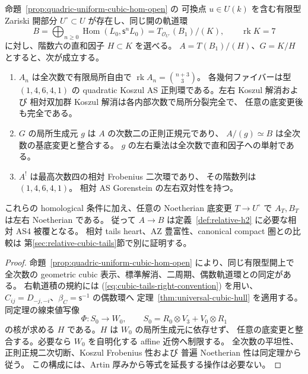 \begin{proposition}[可換点の有限型近傍での相対 AS4 被覆]
\label{prop:quadric-zariski-homological-as-cover}
命題~\ref{prop:quadric-uniform-cubic-hom-open} の
可換点 $u\in U(k)$ を含む有限型 Zariski 開部分
$U^\circ\subset U$ が存在し、同じ開の軌道環
\[
 B=\bigoplus_{n\ge0}\operatorname{Hom}
       (L_0,\mathsf s^nL_0)
       =T_{\mathcal O_{U^\circ}}(B_1)/(K),
 \qquad \operatorname{rk}K=7
\]
に対し、階数六の直和因子 $H\subset K$ を選べる。
$A=T(B_1)/(H)$、$G=K/H$ とすると、次が成立する。
\begin{enumerate}
\item $A_n$ は全次数で有限局所自由で
  $\operatorname{rk}A_n=\binom{n+3}{3}$。
  各幾何ファイバーは型 $(1,4,6,4,1)$ の quadratic
  Koszul AS 正則環である。左右 Koszul 解消および
  相対双加群 Koszul 解消は各内部次数で局所分裂完全で、
  任意の底変更後も完全である。
\item $G$ の局所生成元 $g$ は $A$ の次数二の正則正規元であり、
  $A/(g)\simeq B$ は全次数の基底変更と整合する。
  $g$ の左右乗法は全次数で直和因子への単射である。
\item $A^!$ は最高次数四の相対 Frobenius 二次環であり、
  その階数列は $(1,4,6,4,1)$。
  相対 AS Gorenstein の左右双対性を持つ。
\end{enumerate}
これらの homological 条件に加え、任意の Noetherian 底変更
$T\to U^\circ$ で $A_T,B_T$ は左右 Noetherian である。
従って $A\to B$ は定義~\ref{def:relative-h2} に必要な相対 AS4 被覆となる。
相対 tails heart、AZ 豊富性、canonical compact 圏との比較は
第\ref{sec:relative-cubic-tails}節で別に証明する。
\end{proposition}
\begin{proof}
命題~\ref{prop:quadric-uniform-cubic-hom-open} により、同じ有限型開上で
全次数の geometric cubic 表示、標準解消、二周期、偶数軌道環との同定がある。
右軌道積の規約には (\ref{eq:cubic-tails-right-convention}) を用い、
$C_{ij}=D_{-j,-i}$、$\beta_C=\mathsf s^{-1}$ の偶数環へ
定理~\ref{thm:universal-cubic-hull} を適用する。
同定理の線束値写像
\[
 \Phi:S_0\longrightarrow W_0,\qquad
 S_0=R_0\otimes V_3+V_0\otimes R_1
\]
の核が求める $H$ である。$H$ は $W_0$ の局所生成元に依存せず、
任意の底変更と整合する。必要なら $W_0$ を自明化する affine 近傍へ制限する。
全次数の平坦性、正則正規二次切断、Koszul Frobenius 性および
普遍 Noetherian 性は同定理から従う。
この構成には、Artin 厚みから等式を延長する操作は必要ない。
\end{proof}


